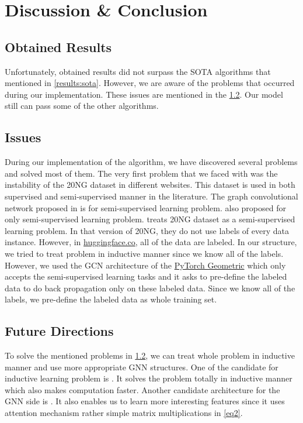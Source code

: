 \section{Discussion \& Conclusion}\label{sec:discussion}

\subsection{Obtained Results}
Unfortunately, obtained results did not surpass the SOTA algorithms that mentioned in \cref{results:sota}. However, we are aware of the problems that occurred during our implementation. These issues are mentioned in the \cref{issues}. Our model still can pass some of the other algorithms. 

\subsection{Issues}\label{issues}
During our implementation of the algorithm, we have discovered several problems and solved most of them. The very first problem that we faced with was the instability of the 20NG dataset in different websites. This dataset is used in both supervised and semi-supervised manner in the literature. The graph convolutional network proposed in \cite{kipf17semisupervised} is for semi-supervised learning problem. \cite{yao18graph} also proposed for only semi-supervised learning problem. \cite{yao18graph} treats 20NG dataset as a semi-supervised learning problem. In that version of 20NG, they do not use labels of every data instance. However, in  \href{https://huggingface.co/datasets/SetFit/20_newsgroups}{huggingface.co}, all of the data are labeled. In our structure, we tried to treat problem in inductive manner since we know all of the labels. However, we used the GCN architecture of the \href{https://pytorch-geometric.readthedocs.io/en/latest/}{PyTorch Geometric} which only accepts the semi-supervised learning tasks and it asks to pre-define the labeled data to do back propagation only on these labeled data. Since we know all of the labels, we pre-define the labeled data as whole training set.

\subsection{Future Directions}
To solve the mentioned problems in \cref{issues}, we can treat whole problem in inductive manner and use more appropriate GNN structures. One of the candidate for inductive learning problem is \cite{fastGCN2018}. It solves the problem totally in inductive manner which also makes computation faster. Another candidate architecture for the GNN side is \cite{guo19attention}. It also enables us to learn more interesting features since it uses attention mechanism rather simple matrix multiplications in \cref{eq2}.